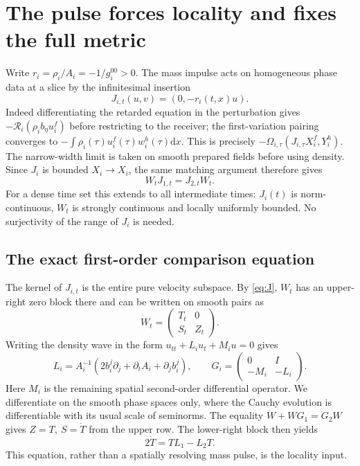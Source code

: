 \documentclass[11pt]{article}
\numberwithin{equation}{section}
\newcommand\dd{\mathrm d}
\newcommand\cR{\mathcal R}
\begin{document}
\section{The pulse forces locality and fixes the full metric}

Write \(r_i=\rho_i/A_i=-1/g_i^{00}>0\). The mass impulse acts on homogeneous phase data at a slice by the infinitesimal insertion
\[
 J_{i,t}(u,v)=(0,-r_i(t,x)u) .
\]
Indeed differentiating the retarded equation in the perturbation gives \(-\cR_i(\rho_i b_\eta u_i^f)\) before restricting to the receiver; the first-variation pairing converges to \(-\int\rho_i(\tau)u_i^f(\tau)w_i^h(\tau)\dd x\). This is precisely
\(-\Omega_{i,\tau}(J_{i,\tau}X_i^f,Y_i^h)\). The narrow-width limit is taken on smooth prepared fields before using density. Since \(J_i\) is bounded \(X_i\to X_i\), the same matching argument therefore gives
\begin{equation}\label{eq:J}
 W_tJ_{1,t}=J_{2,t}W_t .
\end{equation}
For a dense time set this extends to all intermediate times: \(J_i(t)\) is norm-continuous, \(W_t\) is strongly continuous and locally uniformly bounded. No surjectivity of the range of \(J_i\) is needed.

\subsection{The exact first-order comparison equation}

The kernel of \(J_{i,t}\) is the entire pure velocity subspace. By \eqref{eq:J}, \(W_t\) has an upper-right zero block there and can be written on smooth pairs as
\[
 W_t=
 \begin{pmatrix}T_t&0\\ S_t&Z_t\end{pmatrix}.
\]
Writing the density wave in the form \(u_{tt}+L_i u_t+M_i u=0\) gives
\begin{equation}\label{eq:L}
 L_i=A_i^{-1}(2b_i^j\partial_j+\partial_t A_i+\partial_j b_i^j),
 \qquad
 G_i=\begin{pmatrix}0&I\\ -M_i&-L_i\end{pmatrix}.
\end{equation}
Here \(M_i\) is the remaining spatial second-order differential operator. We differentiate on the smooth phase spaces only, where the Cauchy evolution is differentiable with its usual scale of seminorms. The equality \(\dot W+WG_1=G_2W\) gives \(Z=T,\ S=\dot T\) from the upper row. The lower-right block then yields
\begin{equation}\label{eq:tr}
 2\dot T=T L_1-L_2T .
\end{equation}
This equation, rather than a spatially resolving mass pulse, is the locality input.
\end{document}
